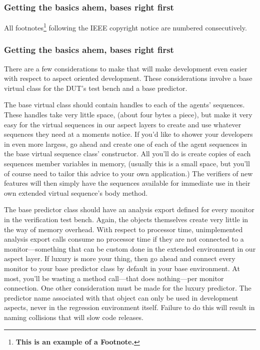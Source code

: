 \documentclass[twocolumn,letterpaper]{IEEEAerospaceCLS}  %
\begin{document}
\subsubsection{Getting the basics ahem, bases right first}
All footnotes\footnote{\bf This is an example of a Footnote.} following the IEEE copyright notice are numbered consecutively. 

\subsubsection{Getting the basics ahem, bases right first}
There are a few considerations to make that will make development even easier with respect to aspect oriented development. These considerations involve a base virtual class for the DUT's test bench and a base predictor.

The base virtual class should contain handles to each of the agents' sequences. These handles take very little space, (about four bytes a piece), but make it very easy for the virtual sequences in our aspect layers to create and use whatever sequences they need at a moments notice. If you'd like to shower your developers in even more largess, go ahead and create one of each of the agent sequences in the base virtual sequence class' constructor. All you'll do is create copies of each sequences member variables in memory, (usually this is a small space, but you'll of course need to tailor this advice to your own application.) The verifiers of new features will then simply have the sequences available for immediate use in their  own extended virtual sequence's body method.

The base predictor class should have an analysis export defined for every monitor in the verification test bench. Again, the objects themselves create very little in the way of memory overhead. With respect to processor time, unimplemented analysis export calls consume no processor time if they are not connected to a monitor—something that can be custom done in the extended environment in our aspect layer. If luxury is more your thing, then go ahead and connect every monitor to your base predictor class by default in your base environment. At most, you'll be wasting a method call—that does nothing—per monitor connection. One other consideration must be made for the luxury predictor. The predictor name associated with that object can only be used in development aspects,  never in the regression environment itself. Failure to do this will result in naming collisions that will slow code releases.
\end{document}
